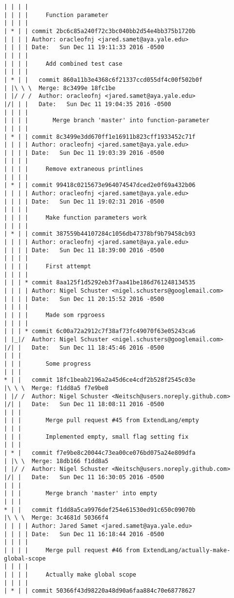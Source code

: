 \begin{lstlisting}
| | | |     
| | | |     Function parameter
| | | |     
| * | | commit 2bc6c85a240f72c3bc040bb2d54e4bb375b1720b
| | | | Author: oracleofnj <jared.samet@aya.yale.edu>
| | | | Date:   Sun Dec 11 19:11:33 2016 -0500
| | | | 
| | | |     Add combined test case
| | | |       
| * | |   commit 860a11b3e4368c6f21337ccd055df4c00f502b0f
| |\ \ \  Merge: 8c3499e 18fc1be
| |/ / /  Author: oracleofnj <jared.samet@aya.yale.edu>
|/| | |   Date:   Sun Dec 11 19:04:35 2016 -0500
| | | |   
| | | |       Merge branch 'master' into function-parameter
| | | |     
| * | | commit 8c3499e3dd670ff1e16911b823cff1933452c71f
| | | | Author: oracleofnj <jared.samet@aya.yale.edu>
| | | | Date:   Sun Dec 11 19:03:39 2016 -0500
| | | | 
| | | |     Remove extraneous printlines
| | | |     
| * | | commit 99418c0215673e964074547dced2e0f69a432b06
| | | | Author: oracleofnj <jared.samet@aya.yale.edu>
| | | | Date:   Sun Dec 11 19:02:31 2016 -0500
| | | | 
| | | |     Make function parameters work
| | | |     
| * | | commit 387559b44107284c1056db47378bf9b79458cb93
| | | | Author: oracleofnj <jared.samet@aya.yale.edu>
| | | | Date:   Sun Dec 11 18:39:00 2016 -0500
| | | | 
| | | |     First attempt
| | | |     
| | | * commit 8aa125f1d5292eb3f7aa41be186d761248134535
| | | | Author: Nigel Schuster <nigel.schusters@googlemail.com>
| | | | Date:   Sun Dec 11 20:15:52 2016 -0500
| | | | 
| | | |     Made som rpgroess
| | | |     
| | | * commit 6c00a72a2912c7f38af73fc49070f63e05243ca6
| |_|/  Author: Nigel Schuster <nigel.schusters@googlemail.com>
|/| |   Date:   Sun Dec 11 18:45:46 2016 -0500
| | |   
| | |       Some progress
| | |      
* | |   commit 18fc1beab2196a2a45d6ce4cdf2b528f2545c03e
|\ \ \  Merge: f1dd8a5 f7e9be8
| |/ /  Author: Nigel Schuster <Neitsch@users.noreply.github.com>
|/| |   Date:   Sun Dec 11 18:08:11 2016 -0500
| | |   
| | |       Merge pull request #45 from ExtendLang/empty
| | |       
| | |       Implemented empty, small flag setting fix
| | |      
| * |   commit f7e9be8c20044c73ea00ce076bd075a24e809dfa
| |\ \  Merge: 18db166 f1dd8a5
| |/ /  Author: Nigel Schuster <Neitsch@users.noreply.github.com>
|/| |   Date:   Sun Dec 11 16:30:05 2016 -0500
| | |   
| | |       Merge branch 'master' into empty
| | |      
* | |   commit f1dd8a5ca9976def254e61530ed91c650c09070b
|\ \ \  Merge: 3c4681d 50366f4
| | | | Author: Jared Samet <jared.samet@aya.yale.edu>
| | | | Date:   Sun Dec 11 16:18:44 2016 -0500
| | | | 
| | | |     Merge pull request #46 from ExtendLang/actually-make-global-scope
| | | |     
| | | |     Actually make global scope
| | | |     
| * | | commit 50366f43d98220a48d90a6faa884c70e68778627

\end{lstlisting}
